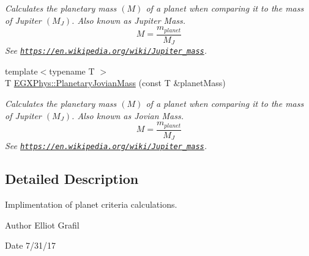 \begin{DoxyCompactItemize}
\begin{DoxyCompactList}\small\item\em Calculates the planetary mass $(M)$ of a planet when comparing it to the mass of Jupiter $(M_J)$. Also known as Jupiter Mass. \[M=\frac{m_{planet}}{M_J}\] See \href{https://en.wikipedia.org/wiki/Jupiter_mass}{\tt https\+://en.\+wikipedia.\+org/wiki/\+Jupiter\+\_\+mass}. \end{DoxyCompactList}\item 
{\footnotesize template$<$typename T $>$ }\\T \mbox{\hyperlink{group___e_g_x_phys-_planetary_mass_ga4663e9388a3bd1a20f94beb52021f293}{E\+G\+X\+Phys\+::\+Planetary\+Jovian\+Mass}} (const T \&planet\+Mass)
\begin{DoxyCompactList}\small\item\em Calculates the planetary mass $(M)$ of a planet when comparing it to the mass of Jupiter $(M_J)$. Also known as Jovian Mass. \[M=\frac{m_{planet}}{M_J}\] See \href{https://en.wikipedia.org/wiki/Jupiter_mass}{\tt https\+://en.\+wikipedia.\+org/wiki/\+Jupiter\+\_\+mass}. \end{DoxyCompactList}\end{DoxyCompactItemize}


\subsection{Detailed Description}
Implimentation of planet criteria calculations. 

\begin{DoxyAuthor}{Author}
Elliot Grafil 
\end{DoxyAuthor}
\begin{DoxyDate}{Date}
7/31/17 
\end{DoxyDate}
